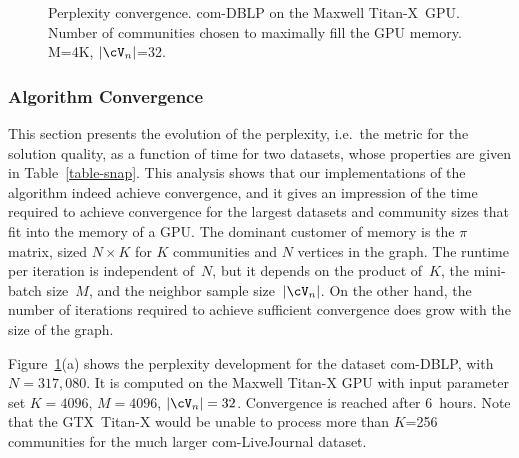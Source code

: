 
\begin{comment}
\begin{figure}[tb]	%
  \centering
  \epsfig{file=plots/ppx-gpu.eps, width=\columnwidth}
  \caption{Perplexity convergence of com-DBLP on the Maxwell \mbox{Titan-X}~GPU. Number
  of communities chosen to maximally fill the GPU memory.}
  \label{fig-ppx-gpu}
\end{figure}

\begin{figure}[tb]	%
  \centering
  \epsfig{file=plots/ppx-cpu.eps, width=\columnwidth}
  \caption{Perplexity convergence of com-LiveJournal on the multi-core~CPU.
  Number of communities chosen to maximally fill the CPU memory.}
  \label{fig-ppx-cpu}
\end{figure}
\end{comment}

\begin{figure}[tb]	%
  \centering
  \caption{Perplexity convergence. com-DBLP on the Maxwell \mbox{Titan-X}~GPU.
  Number of communities chosen to
  maximally fill the GPU memory.
  M=4K, $|\Neighbors|$=32.}
  \label{fig-ppx-gpu-cpu}
\end{figure}

\subsubsection{Algorithm Convergence}

This section presents the evolution of the perplexity, i.e.\ the metric for
the solution quality, as a function of time for
two datasets, whose properties are given in Table~\ref{table-snap}. This
analysis shows that our implementations of the algorithm indeed achieve
convergence, and it gives an impression of the time required to achieve
convergence for the largest datasets and community sizes that fit into the memory
of a GPU. The dominant customer of memory is the
$\pi$ matrix, sized $N{\times}K$ for $K$ communities and $N$ vertices in the
graph. The runtime per iteration is independent of~$N$, but it depends on the
product of~$K$, the mini-batch size~$M$, and the neighbor sample size~$|\Neighbors|$. On
the other hand, the number of iterations required to achieve sufficient
convergence does grow with the size of the graph.

Figure~\ref{fig-ppx-gpu-cpu}(a) shows the perplexity development for the dataset
com-DBLP, with $N=317,080$. It is computed on the Maxwell \mbox{Titan-X} GPU with input
parameter set $K=4096$, $M=4096$, $|\Neighbors|=32$. Convergence is reached after 6~hours.
%
Note that the GTX~\mbox{Titan-X} would be unable to
process more than $K$=256 communities for the much larger com-LiveJournal dataset.
